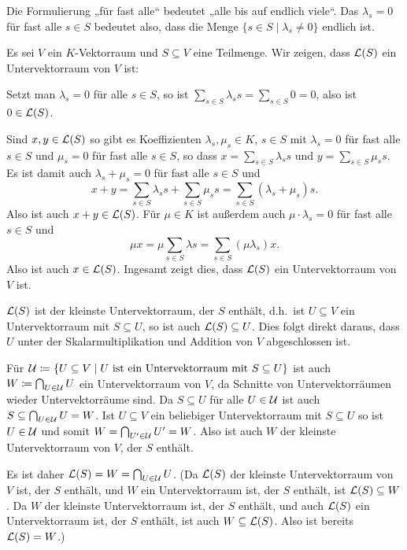 \begin{bem}
 Die Formulierung „für fast alle“ bedeutet „alle bis auf endlich viele“. Das $\lambda_s = 0$ für fast alle $s \in S$ bedeutet also, dass die Menge $\{s \in S \mid \lambda_s \neq 0\}$ endlich ist.
\end{bem}

Es sei $V$ ein $K$-Vektorraum und $S \subseteq V$ eine Teilmenge. Wir zeigen, dass $\mathcal{L}(S)$ ein Untervektorraum von $V$ ist:

Setzt man $\lambda_s = 0$ für alle $s \in S$, so ist $\sum_{s \in S} \lambda_s s = \sum_{s \in S} 0 = 0$, also ist $0 \in \mathcal{L}(S)$.

Sind $x,y \in \mathcal{L}(S)$ so gibt es Koeffizienten $\lambda_s, \mu_s \in K$, $s \in S$ mit $\lambda_s = 0$ für fast alle $s \in S$ und $\mu_s = 0$ für fast alle $s \in S$, so dass $x = \sum_{s \in S} \lambda_s s$ und $y = \sum_{s \in S} \mu_s s$. Es ist damit auch $\lambda_s + \mu_s = 0$ für fast alle $s \in S$ und
\[
 x + y
 = \sum_{s \in S} \lambda_s s + \sum_{s \in S} \mu_s s
 = \sum_{s \in S} (\lambda_s + \mu_s) s.
\]
Also ist auch $x+y \in \mathcal{L}(S)$. Für $\mu \in K$ ist außerdem auch $\mu \cdot \lambda_s = 0$ für fast alle $s \in S$ und
\[
 \mu x
 = \mu \sum_{s \in S} \lambda s
 = \sum_{s \in S} (\mu \lambda_s) x.
\]
Also ist auch $x \in \mathcal{L}(S)$. Ingesamt zeigt dies, dass $\mathcal{L}(S)$ ein Untervektorraum von $V$ ist.

\begin{bem}\label{bem: span is the smallest vector space}
 $\mathcal{L}(S)$ ist der kleinste Untervektorraum, der $S$ enthält, d.h.\ ist $U \subseteq V$ ein Untervektorraum mit $S \subseteq U$, so ist auch $\mathcal{L}(S) \subseteq U$. Dies folgt direkt daraus, dass $U$ unter der Skalarmultiplikation und Addition von $V$ abgeschlossen ist.
 
 Für $\mathcal{U} \coloneqq \{U \subseteq V \mid \text{$U$ ist ein Untervektorraum mit $S \subseteq U$}\}$ ist auch $W \coloneqq \bigcap_{U \in \mathcal{U}} U$ ein Untervektorraum von $V$, da Schnitte von Untervektorräumen wieder Untervektorräume sind. Da $S \subseteq U$ für alle $U \in \mathcal{U}$ ist auch $S \subseteq \bigcap_{U \in \mathcal{U}} U = W$. Ist $U \subseteq V$ ein beliebiger Untervektorraum mit $S \subseteq U$ so ist $U \in \mathcal{U}$ und somit $W = \bigcap_{U' \in \mathcal{U}} U' = W$. Also ist auch $W$ der kleinste Untervektorraum von $V$, der $S$ enthält.
 
 Es ist daher $\mathcal{L}(S) = W = \bigcap_{U \in \mathcal{U}} U$. (Da $\mathcal{L}(S)$ der kleinste Untervektorraum von $V$ ist, der $S$ enthält, und $W$ ein Untervektorraum ist, der $S$ enthält, ist $\mathcal{L}(S) \subseteq W$. Da $W$ der kleinste Untervektorraum ist, der $S$ enthält, und auch $\mathcal{L}(S)$ ein Untervektorraum ist, der $S$ enthält, ist auch $W \subseteq \mathcal{L}(S)$. Also ist bereits $\mathcal{L}(S) = W$.)
\end{bem}





